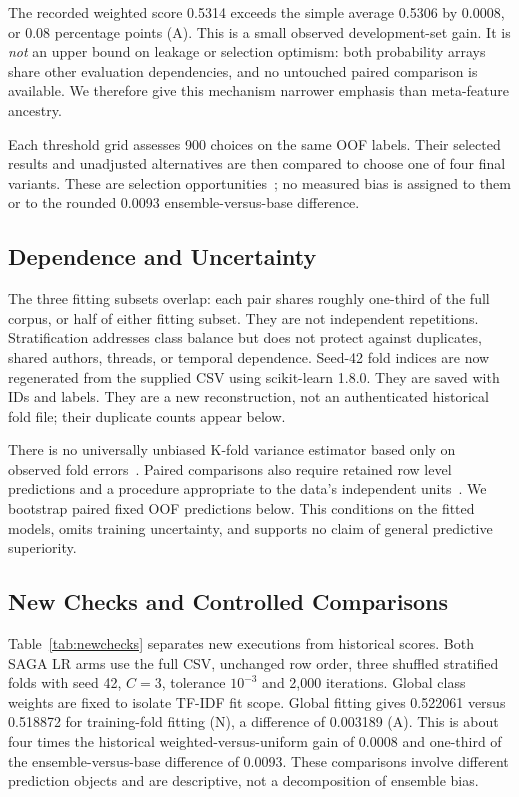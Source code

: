 \documentclass[doublecolumn]{ijcvsplatex}
\begin{document}
The recorded weighted score 0.5314 exceeds the simple average 0.5306 by 0.0008, or 0.08 percentage points (A). This is a small observed development-set gain. It is \emph{not} an upper bound on leakage or selection optimism: both probability arrays share other evaluation dependencies, and no untouched paired comparison is available. We therefore give this mechanism narrower emphasis than meta-feature ancestry.

Each threshold grid assesses 900 choices on the same OOF labels. Their selected results and unadjusted alternatives are then compared to choose one of four final variants. These are selection opportunities~\cite{varma2006bias,cawley2010overfitting}; no measured bias is assigned to them or to the rounded 0.0093 ensemble-versus-base difference.

\subsection{Dependence and Uncertainty}
The three fitting subsets overlap: each pair shares roughly one-third of the full corpus, or half of either fitting subset. They are not independent repetitions. Stratification addresses class balance but does not protect against duplicates, shared authors, threads, or temporal dependence. Seed-42 fold indices are now regenerated from the supplied CSV using scikit-learn 1.8.0. They are saved with IDs and labels. They are a new reconstruction, not an authenticated historical fold file; their duplicate counts appear below.

There is no universally unbiased K-fold variance estimator based only on observed fold errors~\cite{bengio2004variance}. Paired comparisons also require retained row level predictions and a procedure appropriate to the data's independent units~\cite{dror2018significance}. We bootstrap paired fixed OOF predictions below. This conditions on the fitted models, omits training uncertainty, and supports no claim of general predictive superiority.

\subsection{New Checks and Controlled Comparisons}
\label{sec:newchecks}
Table~\ref{tab:newchecks} separates new executions from historical scores. Both SAGA LR arms use the full CSV, unchanged row order, three shuffled stratified folds with seed 42, $C=3$, tolerance $10^{-3}$ and 2,000 iterations. Global class weights are fixed to isolate TF-IDF fit scope. Global fitting gives 0.522061 versus 0.518872 for training-fold fitting (N), a difference of 0.003189 (A). This is about four times the historical weighted-versus-uniform gain of 0.0008 and one-third of the ensemble-versus-base difference of 0.0093. These comparisons involve different prediction objects and are descriptive, not a decomposition of ensemble bias.
\end{document}
